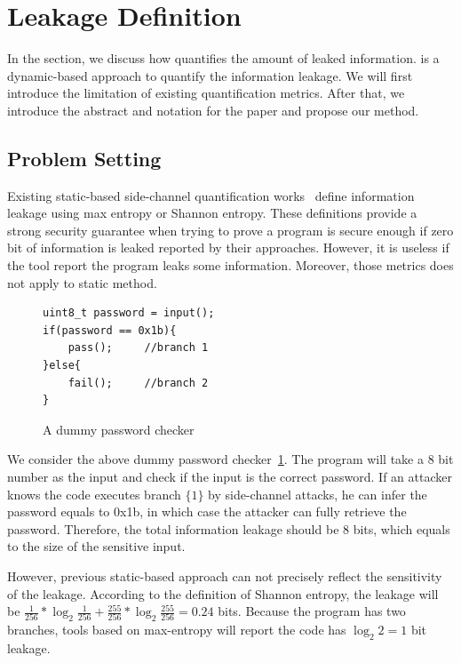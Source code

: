 \section{\tool{} Leakage Definition}
In the section, we discuss how \tool{} quantifies the amount of
leaked information. \tool{} is a dynamic-based approach to 
quantify the information leakage. We will first introduce 
the limitation of existing quantification metrics. After
that, we introduce the abstract and notation for the paper 
and propose our method.

\subsection{Problem Setting}
Existing static-based side-channel quantification works~\cite{182946,Wichelmann:2018:MFF:3274694.3274741 } define information leakage
using max entropy or Shannon entropy. These definitions provide a strong security guarantee
when trying to prove a program is secure enough if zero bit of information is leaked 
reported by their approaches. However, it is useless if the tool report the program leaks
some information. Moreover, those metrics does not apply to static method.


\begin{figure}[h!]
    \centering
\begin{lstlisting}[xleftmargin=.03\textwidth,xrightmargin=.01\textwidth]
uint8_t password = input();
if(password == 0x1b){
    pass();     //branch 1
}else{
    fail();     //branch 2
}
\end{lstlisting}
\caption{A dummy password checker}
\label{figure:password checker}
\end{figure}

We consider the above dummy password checker~\ref{figure:password checker}.
The program will take a 8 bit number as the input and check if the input is the
correct password. 
If an attacker knows the
code executes branch $\{{1\}}$ by side-channel attacks, he can infer the password equals to 0x1b,
in which case the attacker can fully retrieve the password.
Therefore, the total information leakage should be 8 bits, which equals to the size
of the sensitive input. 

However, previous static-based approach can not precisely reflect the sensitivity of the leakage.
According to the definition of Shannon entropy, the leakage will be $\frac{1}{256}*\log_{2}\frac{1}{256} + 
\frac{255}{256} *\log_{2}\frac{255}{256}= 0.24$ bits. Because the program has two branches, tools
based on max-entropy will report the code has $\log_2{2} = 1$ bit leakage.

